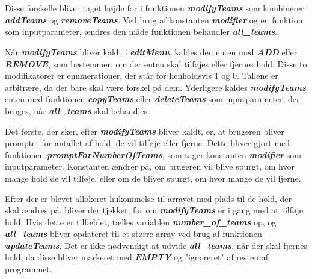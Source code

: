 \\\\
Disse forskelle bliver taget højde for i funktionen \textbf{\textit{modifyTeams}} som kombinerer \textbf{\textit{addTeams}} og \textbf{\textit{removeTeams}}. Ved brug af konstanten \textbf{\textit{modifier}} og en funktion som inputparameter, ændres den måde funktionen behandler \textbf{\textit{all\_teams}}.
\par
Når \textbf{\textit{modifyTeams}} bliver kaldt i \textbf{\textit{editMenu}}, kaldes den enten med \textbf{\textit{ADD}} eller \textbf{\textit{REMOVE}}, som bestemmer, om der enten skal tilføjes eller fjernes hold. Disse to modifikatorer er enumerationer, der står for henholdsvis 1 og 0. Tallene er arbitrære, da der bare skal være forskel på dem. Yderligere kaldes \textbf{\textit{modifyTeams}} enten med funktionen \textbf{\textit{copyTeams}} eller \textbf{\textit{deleteTeams}} som inputparameter, der bruges, når \textbf{\textit{all\_teams}} skal behandles.
\par
Det første, der sker, efter \textbf{\textit{modifyTeams}} bliver kaldt, er, at brugeren bliver promptet for antallet af hold, de vil tilføje eller fjerne. Dette bliver gjort med funktionen \textbf{\textit{promptForNumberOfTeams}}, som tager konstanten \textbf{\textit{modifier}} som inputparameter. Konstanten ændrer på, om brugeren vil blive spurgt, om hvor mange hold de vil tilføje, eller om de bliver spurgt, om hvor mange de vil fjerne. 
\par
Efter der er blevet allokeret hukommelse til arrayet med plads til de hold, der skal ændres på, bliver der tjekket, for om \textbf{\textit{modifyTeams}} er i gang med at tilføje hold. Hvis dette er tilfældet, tælles variablen \textbf{\textit{number\_of\_teams}} op, og \textbf{\textit{all\_teams}} bliver opdateret til et større array ved brug af funktionen \textbf{\textit{updateTeams}}. Det er ikke nødvendigt at udvide \textbf{\textit{all\_teams}}, når der skal fjernes hold, da disse bliver markeret med \textbf{\textit{EMPTY}} og "ignoreret" af resten af programmet.
